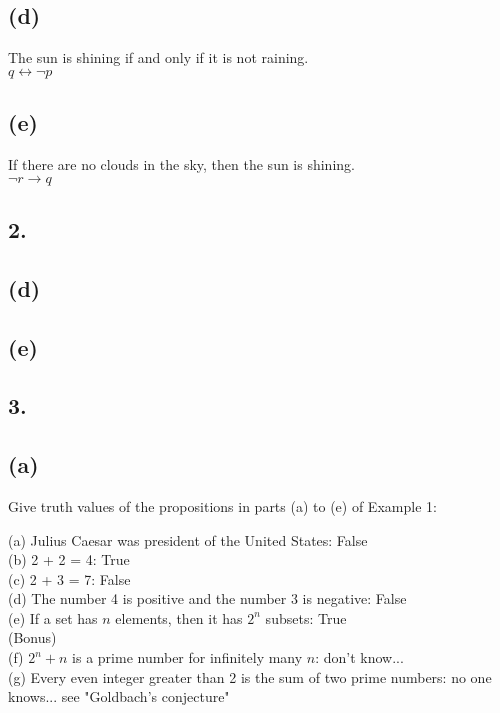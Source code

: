 \documentclass[11pt]{article}
\begin{document}
\subsection*{(d)}
\begin{center}
The sun is shining if and only if it is not raining.\\
\hfill \break
$q \longleftrightarrow \neg p$
\end{center}

\subsection*{(e)}
\begin{center}
If there are no clouds in the sky, then the sun is shining.\\
\hfill \break
$\neg r \rightarrow q$
\end{center}
%
%
\subsection*{2.}

\subsection*{(d)}
\begin{center}

\end{center}

\subsection*{(e)}
\begin{center}

\end{center}
%
%
\subsection*{3.}

\subsection*{(a)}
\begin{center}
Give truth values of the propositions in parts (a) to (e) of Example 1:\\
\end{center}

\begin{flushleft}
(a) Julius Caesar was president of the United States: False\\
(b) 2 + 2 = 4: True\\
(c) 2 + 3 = 7: False\\
(d) The number 4 is positive and the number 3 is negative: False\\
(e) If a set has $n$ elements, then it has $2^{n}$ subsets: True\\
(Bonus)\\
(f) $2^{n} + n $ is a prime number for infinitely many $n$: don't know...\\
(g) Every even integer greater than 2 is the sum of two prime numbers: no one knows... see "Goldbach's conjecture"\\
\end{flushleft}
\end{document}
